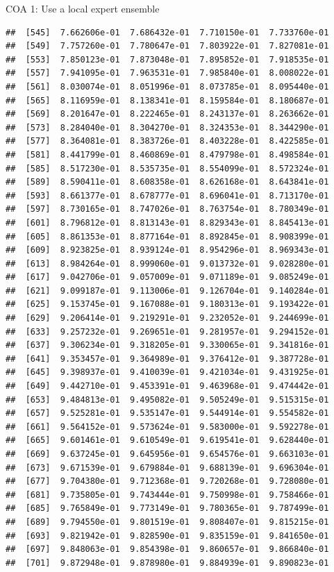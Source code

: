 \documentclass[ignorenonframetext,]{beamer}
\begin{document}
\begin{frame}[fragile]{COA 1: Use a local expert ensemble}
\begin{verbatim}
##  [545]  7.662606e-01  7.686432e-01  7.710150e-01  7.733760e-01
##  [549]  7.757260e-01  7.780647e-01  7.803922e-01  7.827081e-01
##  [553]  7.850123e-01  7.873048e-01  7.895852e-01  7.918535e-01
##  [557]  7.941095e-01  7.963531e-01  7.985840e-01  8.008022e-01
##  [561]  8.030074e-01  8.051996e-01  8.073785e-01  8.095440e-01
##  [565]  8.116959e-01  8.138341e-01  8.159584e-01  8.180687e-01
##  [569]  8.201647e-01  8.222465e-01  8.243137e-01  8.263662e-01
##  [573]  8.284040e-01  8.304270e-01  8.324353e-01  8.344290e-01
##  [577]  8.364081e-01  8.383726e-01  8.403228e-01  8.422585e-01
##  [581]  8.441799e-01  8.460869e-01  8.479798e-01  8.498584e-01
##  [585]  8.517230e-01  8.535735e-01  8.554099e-01  8.572324e-01
##  [589]  8.590411e-01  8.608358e-01  8.626168e-01  8.643841e-01
##  [593]  8.661377e-01  8.678777e-01  8.696041e-01  8.713170e-01
##  [597]  8.730165e-01  8.747026e-01  8.763754e-01  8.780349e-01
##  [601]  8.796812e-01  8.813143e-01  8.829343e-01  8.845413e-01
##  [605]  8.861353e-01  8.877164e-01  8.892845e-01  8.908399e-01
##  [609]  8.923825e-01  8.939124e-01  8.954296e-01  8.969343e-01
##  [613]  8.984264e-01  8.999060e-01  9.013732e-01  9.028280e-01
##  [617]  9.042706e-01  9.057009e-01  9.071189e-01  9.085249e-01
##  [621]  9.099187e-01  9.113006e-01  9.126704e-01  9.140284e-01
##  [625]  9.153745e-01  9.167088e-01  9.180313e-01  9.193422e-01
##  [629]  9.206414e-01  9.219291e-01  9.232052e-01  9.244699e-01
##  [633]  9.257232e-01  9.269651e-01  9.281957e-01  9.294152e-01
##  [637]  9.306234e-01  9.318205e-01  9.330065e-01  9.341816e-01
##  [641]  9.353457e-01  9.364989e-01  9.376412e-01  9.387728e-01
##  [645]  9.398937e-01  9.410039e-01  9.421034e-01  9.431925e-01
##  [649]  9.442710e-01  9.453391e-01  9.463968e-01  9.474442e-01
##  [653]  9.484813e-01  9.495082e-01  9.505249e-01  9.515315e-01
##  [657]  9.525281e-01  9.535147e-01  9.544914e-01  9.554582e-01
##  [661]  9.564152e-01  9.573624e-01  9.583000e-01  9.592278e-01
##  [665]  9.601461e-01  9.610549e-01  9.619541e-01  9.628440e-01
##  [669]  9.637245e-01  9.645956e-01  9.654576e-01  9.663103e-01
##  [673]  9.671539e-01  9.679884e-01  9.688139e-01  9.696304e-01
##  [677]  9.704380e-01  9.712368e-01  9.720268e-01  9.728080e-01
##  [681]  9.735805e-01  9.743444e-01  9.750998e-01  9.758466e-01
##  [685]  9.765849e-01  9.773149e-01  9.780365e-01  9.787499e-01
##  [689]  9.794550e-01  9.801519e-01  9.808407e-01  9.815215e-01
##  [693]  9.821942e-01  9.828590e-01  9.835159e-01  9.841650e-01
##  [697]  9.848063e-01  9.854398e-01  9.860657e-01  9.866840e-01
##  [701]  9.872948e-01  9.878980e-01  9.884939e-01  9.890823e-01

\end{verbatim}
\end{frame}
\end{document}
